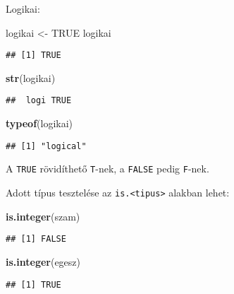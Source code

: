 \documentclass[]{book}
\newenvironment{Shaded}{\begin{snugshade}}{\end{snugshade}}
\newcommand{\KeywordTok}[1]{\textcolor[rgb]{0.13,0.29,0.53}{\textbf{#1}}}
\newcommand{\StringTok}[1]{\textcolor[rgb]{0.31,0.60,0.02}{#1}}
\newcommand{\OtherTok}[1]{\textcolor[rgb]{0.56,0.35,0.01}{#1}}
\newcommand{\NormalTok}[1]{#1}
\begin{document}
Logikai:

\begin{Shaded}
\begin{Highlighting}[]
\NormalTok{logikai <-}\StringTok{ }\OtherTok{TRUE}
\NormalTok{logikai}
\end{Highlighting}
\end{Shaded}

\begin{verbatim}
## [1] TRUE
\end{verbatim}

\begin{Shaded}
\begin{Highlighting}[]
\KeywordTok{str}\NormalTok{(logikai)}
\end{Highlighting}
\end{Shaded}

\begin{verbatim}
##  logi TRUE
\end{verbatim}

\begin{Shaded}
\begin{Highlighting}[]
\KeywordTok{typeof}\NormalTok{(logikai)}
\end{Highlighting}
\end{Shaded}

\begin{verbatim}
## [1] "logical"
\end{verbatim}

A \texttt{TRUE} rövidíthető \texttt{T}-nek, a \texttt{FALSE} pedig
\texttt{F}-nek.

Adott típus tesztelése az \texttt{is.\textless{}tipus\textgreater{}}
alakban lehet:

\begin{Shaded}
\begin{Highlighting}[]
\KeywordTok{is.integer}\NormalTok{(szam)}
\end{Highlighting}
\end{Shaded}

\begin{verbatim}
## [1] FALSE
\end{verbatim}

\begin{Shaded}
\begin{Highlighting}[]
\KeywordTok{is.integer}\NormalTok{(egesz)}
\end{Highlighting}
\end{Shaded}

\begin{verbatim}
## [1] TRUE
\end{verbatim}
\end{document}
